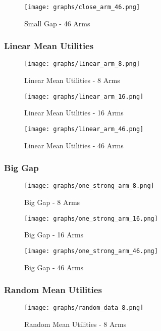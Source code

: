 \documentclass{llncs}
\begin{document}
\begin{figure}[h!]
\centering
  \texttt{[image: graphs/close\_arm\_46.png]}
  \caption{Small Gap - 46 Arms}
\end{figure}


\subsubsection{Linear Mean Utilities}

\begin{figure}[h!]
\centering
  \texttt{[image: graphs/linear\_arm\_8.png]}
  \caption{Linear Mean Utilities - 8 Arms}
\end{figure}

\begin{figure}[h!]
\centering
  \texttt{[image: graphs/linear\_arm\_16.png]}
  \caption{Linear Mean Utilities - 16 Arms}
\end{figure}

\begin{figure}[h!]
\centering
  \texttt{[image: graphs/linear\_arm\_46.png]}
  \caption{Linear Mean Utilities - 46 Arms}
\end{figure}

\subsubsection{Big Gap}

\begin{figure}[h!]
\centering
  \texttt{[image: graphs/one\_strong\_arm\_8.png]}
  \caption{Big Gap - 8 Arms}
\end{figure}

\begin{figure}[h!]
\centering
  \texttt{[image: graphs/one\_strong\_arm\_16.png]}
  \caption{Big Gap - 16 Arms}
\end{figure}

\begin{figure}[h!]
\centering
  \texttt{[image: graphs/one\_strong\_arm\_46.png]}
  \caption{Big Gap - 46 Arms}
\end{figure}

\subsubsection{Random Mean Utilities}

\begin{figure}[h!]
\centering
  \texttt{[image: graphs/random\_data\_8.png]}
  \caption{Random Mean Utilities - 8 Arms}
\end{figure}
\end{document}
